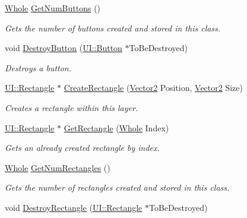 \begin{DoxyCompactItemize}
\hyperlink{namespacephys_a460f6bc24c8dd347b05e0366ae34f34a}{Whole} \hyperlink{classphys_1_1UILayer_a07ff0fc6febb6704f6cf78aa5b7a6fb9}{GetNumButtons} ()
\begin{DoxyCompactList}\small\item\em Gets the number of buttons created and stored in this class. \item\end{DoxyCompactList}\item 
void \hyperlink{classphys_1_1UILayer_a8bb2f42fed52d5776d16911ffc4435ee}{DestroyButton} (\hyperlink{classphys_1_1UI_1_1Button}{UI::Button} $\ast$ToBeDestroyed)
\begin{DoxyCompactList}\small\item\em Destroys a button. \item\end{DoxyCompactList}\item 
\hyperlink{classphys_1_1UI_1_1Rectangle}{UI::Rectangle} $\ast$ \hyperlink{classphys_1_1UILayer_ac3a40183555b370737d6f6954ea0f8e3}{CreateRectangle} (\hyperlink{classphys_1_1Vector2}{Vector2} Position, \hyperlink{classphys_1_1Vector2}{Vector2} Size)
\begin{DoxyCompactList}\small\item\em Creates a rectangle within this layer. \item\end{DoxyCompactList}\item 
\hyperlink{classphys_1_1UI_1_1Rectangle}{UI::Rectangle} $\ast$ \hyperlink{classphys_1_1UILayer_afb2b94ddabf0cce255dbd82d4e8a9312}{GetRectangle} (\hyperlink{namespacephys_a460f6bc24c8dd347b05e0366ae34f34a}{Whole} Index)
\begin{DoxyCompactList}\small\item\em Gets an already created rectangle by index. \item\end{DoxyCompactList}\item 
\hyperlink{namespacephys_a460f6bc24c8dd347b05e0366ae34f34a}{Whole} \hyperlink{classphys_1_1UILayer_a42ad4ae8ba37db911270a3b1950b9814}{GetNumRectangles} ()
\begin{DoxyCompactList}\small\item\em Gets the number of rectangles created and stored in this class. \item\end{DoxyCompactList}\item 
void \hyperlink{classphys_1_1UILayer_a4342bebb6cd81518268beb658668b438}{DestroyRectangle} (\hyperlink{classphys_1_1UI_1_1Rectangle}{UI::Rectangle} $\ast$ToBeDestroyed)

\end{DoxyCompactItemize}
